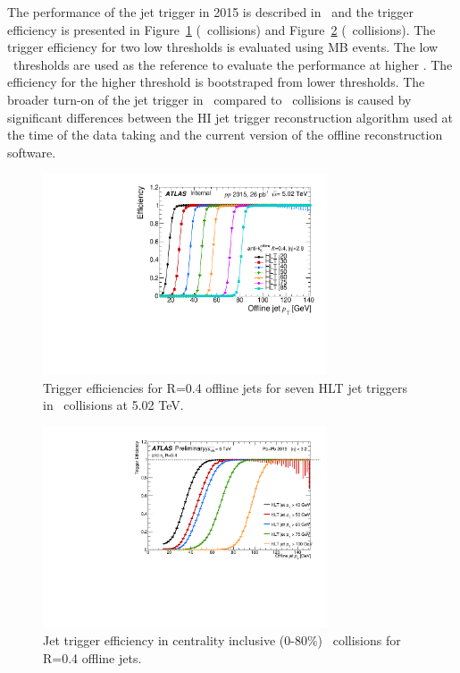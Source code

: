   The performance of the jet trigger in 2015 is described in~\cite{HITMF} and the trigger efficiency is presented in Figure~\ref{Fig:Trigger_pp5} (\pp\ collisions) and Figure~\ref{fig:Trigger_PbPb} (\pbpb\ collisions). The trigger efficiency for two low thresholds is evaluated using MB events. The low \pT\ thresholds are used as the reference to evaluate the performance at higher \pT. The efficiency for the higher threshold is bootstraped from lower thresholds. The broader turn-on of the jet trigger in \pbpb\ compared to \pp\ collisions is caused by significant differences between the HI jet trigger reconstruction algorithm used at the time of the data taking and the current version of the offline reconstruction software.

  \begin{figure}[h]
 \centerline{
 \includegraphics[width=0.75\textwidth]{figures_general/Eff_pp_5TeV_central.pdf}
}
 \caption{Trigger efficiencies for R=0.4 offline jets for seven HLT jet triggers in \pp\ collisions at 5.02 TeV.}
 \label{Fig:Trigger_pp5}
 \end{figure}


 \begin{figure}[h]
    \centerline{
       \includegraphics[width=0.75\textwidth]{figures_general/trigger_eff_PbPb_CentInclusive.pdf}
    }
    \caption{Jet trigger efficiency in centrality inclusive (0-80\%) \pbpb\ collisions for R=0.4 offline
    jets.}
    \label{fig:Trigger_PbPb}
 \end{figure}

